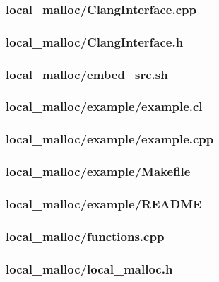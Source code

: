 \documentclass{article}
\begin{document}
\subsubsection*{local\_malloc/ClangInterface.cpp}


\subsubsection*{local\_malloc/ClangInterface.h}


\subsubsection*{local\_malloc/embed\_src.sh}


\subsubsection*{local\_malloc/example/example.cl}


\subsubsection*{local\_malloc/example/example.cpp}


\subsubsection*{local\_malloc/example/Makefile}


\subsubsection*{local\_malloc/example/README}


\subsubsection*{local\_malloc/functions.cpp}


\subsubsection*{local\_malloc/local\_malloc.h}

\end{document}
